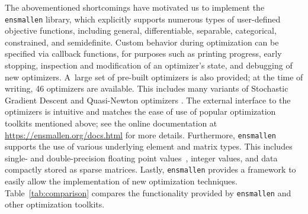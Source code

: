 \documentclass[twoside,11pt]{article}
\begin{document}

The abovementioned shortcomings have motivated us to implement the {\tt ensmallen} library,
which explicitly supports numerous types of user-defined objective functions,
including general, differentiable, separable, categorical, constrained, and semidefinite.
Custom behavior during optimization can be specified via {callback} functions,
for purposes such as printing progress, early stopping, inspection and modification of an optimizer's state,
and debugging of new optimizers.
A~large set of pre-built optimizers is also provided;
at the time of writing, 46 optimizers are available.
This includes many variants of Stochastic Gradient Descent \citep{Ruder_2016}
and Quasi-Newton optimizers \citep{zhu1997algorithm}.
The external interface to the optimizers is intuitive
and matches the ease of use of popular
optimization toolkits mentioned above;
see the online documentation at \mbox{\url{https://ensmallen.org/docs.html}} for more details.
Furthermore, {\tt ensmallen} supports the use of various underlying element and matrix types.
This includes single- and double-precision floating point values~\citep{Goldberg_CSUR_1991}, 
integer values, and data compactly stored as sparse matrices.
Lastly, {\tt ensmallen} provides a framework to easily allow the implementation of new optimization techniques.
Table~\ref{tab:comparison} compares the functionality provided
by {\tt ensmallen} and other optimization toolkits.
\end{document}
